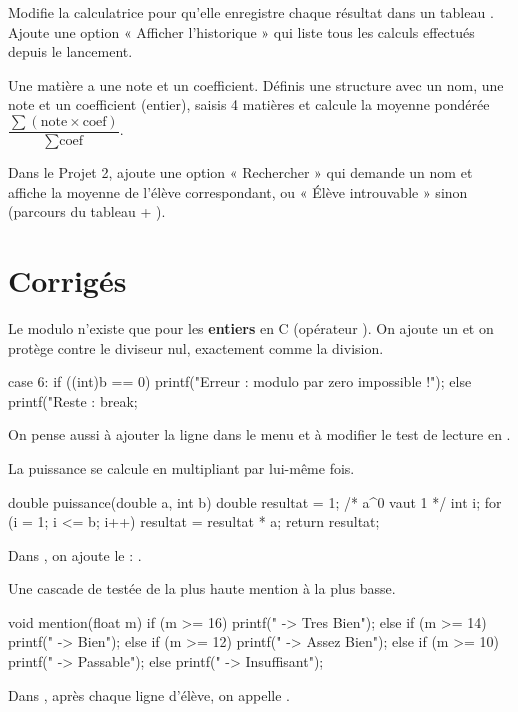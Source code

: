 Modifie la calculatrice pour qu'elle enregistre chaque résultat dans un tableau
. Ajoute une option « Afficher l'historique » qui
liste tous les calculs effectués depuis le lancement.

Une matière a une note et un coefficient. Définis une structure  avec
un nom, une note et un coefficient (entier), saisis 4 matières et calcule la moyenne
pondérée $\dfrac{\sum (\text{note}\times\text{coef})}{\sum \text{coef}}$.

Dans le Projet 2, ajoute une option « Rechercher » qui demande un nom et affiche la
moyenne de l'élève correspondant, ou « Élève introuvable » sinon (parcours du
tableau + ).

\section{Corrigés}

Le modulo n'existe que pour les \textbf{entiers} en C (opérateur \code{\%}). On
ajoute un  et on protège contre le diviseur nul, exactement comme la
division.
\begin{codec}
case 6:
    if ((int)b == 0) {
        printf("Erreur : modulo par zero impossible !\n");
    } else {
        printf("Reste : %
    }
    break;
\end{codec}
On pense aussi à ajouter la ligne  dans le menu et à
modifier le test de lecture en .

La puissance se calcule en multipliant  par lui-même  fois.
\begin{codec}
double puissance(double a, int b) {
    double resultat = 1;   /* a^0 vaut 1 */
    int i;
    for (i = 1; i <= b; i++) {
        resultat = resultat * a;
    }
    return resultat;
}
\end{codec}
Dans , on ajoute le  : .

Une cascade de  testée de la plus haute mention à la plus
basse.
\begin{codec}
void mention(float m) {
    if      (m >= 16) printf(" -> Tres Bien\n");
    else if (m >= 14) printf(" -> Bien\n");
    else if (m >= 12) printf(" -> Assez Bien\n");
    else if (m >= 10) printf(" -> Passable\n");
    else              printf(" -> Insuffisant\n");
}
\end{codec}
Dans , après chaque ligne d'élève, on appelle
.

